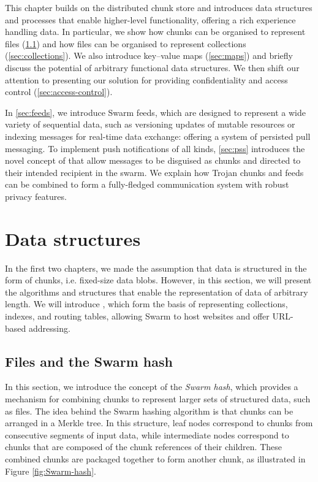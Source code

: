 This chapter builds on the distributed chunk store and introduces data structures and processes that enable higher-level functionality, offering a rich experience handling data. In particular, we show how chunks can be organised to represent files (\ref{sec:files}) and how files can be organised to represent collections (\ref{sec:collections}). We also introduce key--value maps (\ref{sec:maps}) and briefly discuss the potential of arbitrary functional data structures. We then shift our attention to presenting our solution for providing confidentiality and access control (\ref{sec:access-control}). 

In \ref{sec:feeds}, we introduce Swarm feeds, which are designed to represent a wide variety of sequential data, such as versioning updates of mutable resources or indexing messages for real-time data exchange: offering a system of persisted pull messaging. To implement push notifications of all kinds, \ref{sec:pss} introduces the novel concept of  that allow messages to be disguised as chunks and directed to their intended recipient in the swarm. We explain how Trojan chunks and feeds can be combined to form a fully-fledged communication system with robust privacy features.                                                       

\section{Data structures\statusgreen}\label{sec:datastructures}

\green{}

In the first two chapters, we made the assumption that data is structured in the form of chunks, i.e. fixed-size data blobs. However, in this section, we will present the algorithms and structures that enable the representation of data of arbitrary length. We will introduce , which form the basis of representing collections, indexes, and routing tables, allowing Swarm to host websites and offer URL-based addressing.

\subsection{Files and the Swarm hash\statusgreen}\label{sec:files}

In this section, we introduce the concept of the \emph{Swarm hash}, which provides a mechanism for combining chunks to represent larger sets of structured data, such as files. The idea behind the Swarm hashing algorithm is that chunks can be arranged in a Merkle tree. In this structure, leaf nodes correspond to chunks from consecutive segments of input data, while intermediate nodes correspond to chunks that are composed of the chunk references of their children. These combined chunks are packaged together to form another chunk, as illustrated in Figure \ref{fig:Swarm-hash}. 



